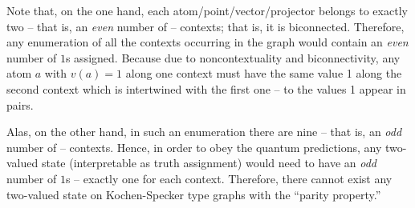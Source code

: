{Note that, on the one hand,
each atom/point/vector/projector belongs
to exactly two -- that is, an {\em even} number of -- contexts; that is, it is biconnected.
Therefore,
any enumeration of  all the contexts occurring in the graph
would contain an {\em even} number of $1$s assigned.
Because due to noncontextuality and biconnectivity,
any atom $a$ with $v(a)=1$ along one context must have the same value 1 along the second context
which is intertwined with the first one -- to the values 1 appear in pairs.

Alas, on the other hand, in such an enumeration
there are nine  -- that is, an {\em odd} number of -- contexts.
Hence,
in order to obey the quantum predictions,
any  two-valued state (interpretable as truth assignment)
would need to have an {\em odd} number of $1$s -- exactly one for each context.
Therefore, there cannot exist any two-valued state on Kochen-Specker type graphs with the  ``parity property.''

}
